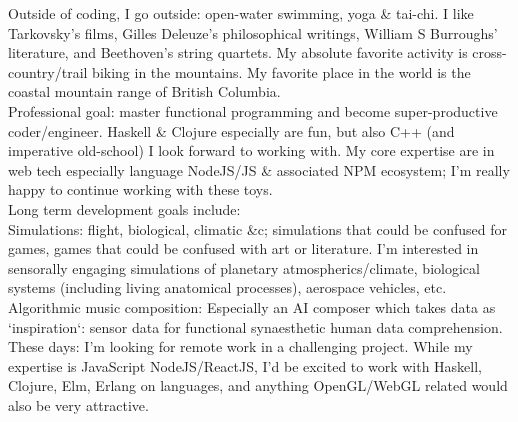 \documentclass[10pt,hidelinks]{article}
\begin{document}
Outside of coding, I go outside: open-water swimming, yoga \& tai-chi. I like Tarkovsky's films, Gilles Deleuze's philosophical writings, William S Burroughs' literature, and Beethoven's string quartets. My absolute favorite activity is cross-country/trail biking in the mountains.  My favorite place in the world is the coastal mountain range of British Columbia. \\
Professional goal: master functional programming and become super-productive coder/engineer. \textemdash Haskell \& Clojure especially are fun, but also C++ (and imperative old-school) I look forward to working with. My core expertise are in web tech especially language NodeJS/JS \& associated NPM ecosystem; I'm really happy to continue working with these toys. \\
Long term development goals include: \\
Simulations: flight, biological, climatic \&c; simulations that could be confused for games, games that could be confused with art or literature.
I'm interested in sensorally engaging simulations of planetary atmospherics/climate, biological systems (including living anatomical processes), aerospace vehicles, etc. \\
Algorithmic music composition: Especially an AI composer which takes data as `inspiration`: sensor data for functional synaesthetic human data comprehension.
\\

These days: I'm looking for remote work in a challenging project.  While my expertise is JavaScript NodeJS/ReactJS, I'd be excited to work with Haskell, Clojure, Elm, Erlang on languages, and anything OpenGL/WebGL related would also be very attractive.
\end{document}
